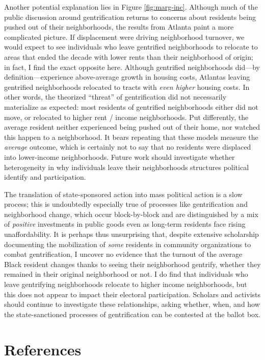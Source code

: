 \documentclass[
  12pt,
]{article}
\begin{document}
Another potential explanation lies in Figure \ref{fig:marg-inc}. Although much of the public discussion around gentrification returns to concerns about residents being pushed out of their neighborhoods, the results from Atlanta paint a more complicated picture. If displacement were driving neighborhood turnover, we would expect to see individuals who leave gentrified neighborhoods to relocate to areas that ended the decade with lower rents than their neighborhood of origin; in fact, I find the exact opposite here. Although gentrified neighborhoods did---by definition---experience above-average growth in housing costs, Atlantas leaving gentrified neighborhoods relocated to tracts with \emph{even higher} housing costs. In other words, the theorized ``threat'' of gentrification did not necessarily materialize as expected: most residents of gentrified neighborhoods either did not move, or relocated to higher rent / income neighborhoods. Put differently, the average resident neither experienced being pushed out of their home, nor watched this happen to a neighborhood. It bears repeating that these models measure the \emph{average} outcome, which is certainly not to say that no residents were displaced into lower-income neighborhoods. Future work should investigate whether heterogeneity in why individuals leave their neighborhoods structures political identify and participation.

The translation of state-sponsored action into mass political action is a slow process; this is undoubtedly especially true of processes like gentrification and neighborhood change, which occur block-by-block and are distinguished by a mix of \emph{positive} investments in public goods even as long-term residents face rising unaffordability. It is perhaps thus unsurprising that, despite extensive scholarship documenting the mobilization of \emph{some} residents in community organizations to combat gentrification, I uncover no evidence that the turnout of the average Black resident changes thanks to seeing their neighborhood gentrify, whether they remained in their original neighborhood or not. I do find that individuals who leave gentrifying neighborhoods relocate to higher income neighborhoods, but this does not appear to impact their electoral participation. Scholars and activists should continue to investigate these relationships, asking whether, when, and how the state-sanctioned processes of gentrification can be contested at the ballot box.

\newpage

\hypertarget{references}{%
\section*{References}\label{references}}
\end{document}

